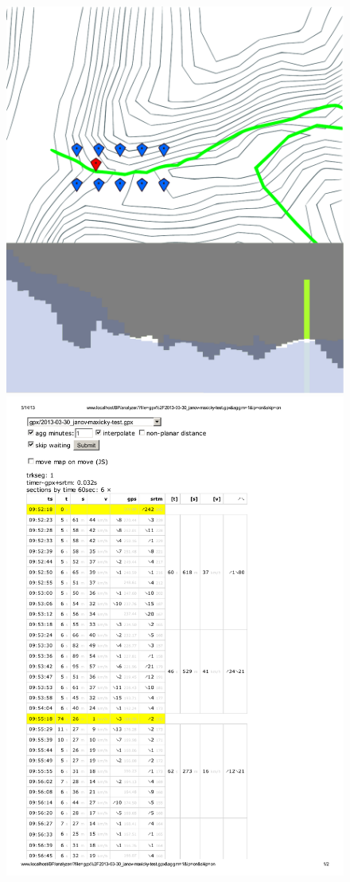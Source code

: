 \documentclass[thesis=B,czech]{FITthesis}[2012/06/26]
\begin{document}
\begin{figure}[htp]
\centering
\includegraphics[width=\columnwidth,trim=0 0 0 5cm,clip]{obrazky/analyzer.pdf}
\includegraphics[width=\columnwidth,page=2,trim=1.2cm 11.5cm 6cm 10.3cm,clip]{obrazky/analyzer-tabulka.pdf}

\end{figure}
\end{document}
